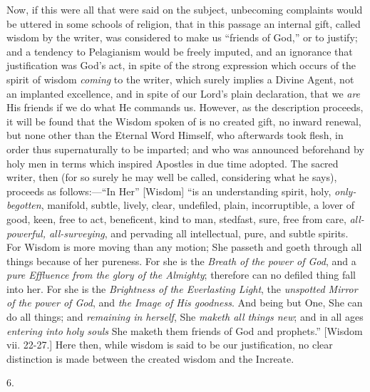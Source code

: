 Now, if this were all that were said on the subject, unbecoming
complaints would be uttered in some schools of religion, that in this
passage an internal gift, called wisdom by the writer, was considered
to make us ``friends of God,'' or to justify; and a
tendency to Pelagianism would be freely imputed, and an ignorance that
justification was God's act, in spite of the strong expression which
occurs of the spirit of wisdom \emph{coming} to the writer, which
surely implies a Divine Agent, not an implanted excellence, and in
spite of our Lord's plain declaration, that we \emph{are} His friends
if we do what He commands us. However, as the description proceeds, it
will be found that the Wisdom spoken of is no created gift, no inward
renewal, but none other than the Eternal Word Himself, who afterwards
took flesh, in order thus supernaturally to be imparted; and who was
announced beforehand by holy men in terms which inspired Apostles in
due time adopted. The sacred writer, then (for so surely he may well
be called, considering what he says), proceeds as follows:—``In
Her'' [Wisdom] ``is an understanding spirit, holy, \emph{only-begotten},
manifold, subtle, lively, clear, undefiled, plain, incorruptible, a
lover of good, keen, free to act, beneficent, kind to man, stedfast,
sure, free from care, \emph{all-powerful, all-surveying}, and
pervading all intellectual, pure, and subtle spirits. For Wisdom is
more moving than any motion; She passeth and goeth through all things
because of her pureness. For she is the \emph{Breath of the power of God},
and a \emph{pure Effluence from the glory of the Almighty}; therefore
can no defiled thing fall into her. For she is the \emph{Brightness of
the Everlasting Light}, the \emph{unspotted Mirror of the power of God},
and \emph{the Image of His goodness}. And being but One, She can do
all things; and \emph{remaining in herself}, She \emph{maketh all things
new}; and in all ages \emph{entering into} \emph{holy souls}
She maketh them friends of God and prophets.'' [Wisdom vii.
22-27.] Here then, while wisdom is said to be our justification, no
clear distinction is made between the created wisdom and the Increate.

6.

